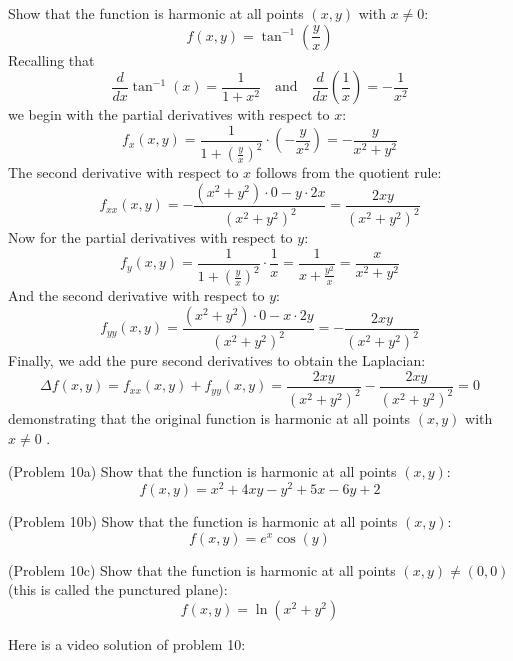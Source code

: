 \documentclass[handout]{ximera}
\begin{document}
\begin{example}[Example 10]
Show that the function is harmonic at all points $(x,y)$ with $x \neq 0$:
\[
f(x,y) = \tan^{-1}\left(\frac{y}{x}\right)
\]
Recalling that 
\[
\frac{d}{dx}\tan^{-1}(x) = \frac{1}{1+x^2} \quad \text{and} \quad 
\frac{d}{dx} \left(\frac{1}{x}\right) = -\frac{1}{x^2}
\]
we begin with the partial derivatives with respect to $x$:
\[
f_x(x,y) = \frac{1}{1+\left(\frac{y}{x}\right)^2} \cdot 
\left(-\frac{y}{x^2}\right) = -\frac{y}{x^2 + y^2}
\]
The second derivative with respect to $x$ follows from the quotient rule:
\[
f_{xx}(x,y) = -\frac{(x^2 + y^2) \cdot 0 - y \cdot 2x}{(x^2 + y^2)^2} = 
\frac{2xy}{(x^2 + y^2)^2}
\]
Now for the partial derivatives with respect to $y$:
\[
f_y(x,y) = \frac{1}{1+\left(\frac{y}{x}\right)^2} \cdot \frac{1}{x} = 
\frac{1}{x + \frac{y^2}{x}} = \frac{x}{x^2 + y^2}
\]
And the second derivative with respect to $y$:
\[
f_{yy}(x,y) = \frac{(x^2+y^2)\cdot 0 - x \cdot 2y}{(x^2 + y^2)^2} = 
-\frac{2xy}{(x^2 + y^2)^2}
\]
Finally, we add the pure second derivatives to obtain the Laplacian:
\[
\Delta f(x,y) = f_{xx}(x,y) + f_{yy}(x,y) = 
\frac{2xy}{(x^2 + y^2)^2}-\frac{2xy}{(x^2 + y^2)^2} =0
\]
demonstrating that the original function is harmonic at all points $(x,y)$ with $x \neq 0$ .
\end{example}

\begin{problem}(Problem 10a)
Show that the function is harmonic at all points $(x,y)$:
\[
f(x,y) = x^2 + 4xy - y^2 + 5x - 6y +2
\]

\end{problem}

\begin{problem}(Problem 10b)
Show that the function is harmonic at all points $(x,y)$:
\[
f(x,y) = e^x \cos(y)
\]

\end{problem}

\begin{problem}(Problem 10c)
Show that the function is harmonic at all points $(x,y) \neq (0,0)$ 
(this is called the punctured plane):
\[
f(x,y) = \ln(x^2 + y^2)
\]

\end{problem}

Here is a video solution of problem 10:\\
\begin{foldable}
\end{foldable}
\end{document}
